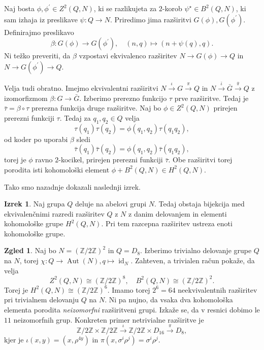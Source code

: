 \documentclass[11pt]{book}
\def\ZZ{\mathbb{Z}}
\DeclareMathOperator\Aut{Aut}
\DeclareMathOperator\id{id}
\theoremstyle{definition}
\theoremstyle{zgled}
\newtheorem*{zgled}{Zgled}
\theoremstyle{odprtproblem}
\theoremstyle{domacanaloga}
\theoremstyle{izrek}
\newtheorem*{izrek}{Izrek}
\begin{document}
Naj bosta $\phi, \phi^\prime \in Z^2(Q,N)$, ki se razlikujeta za $2$-korob $\psi^\star \in B^2(Q,N)$, ki sam izhaja iz preslikave $\psi \colon Q \to N$. Priredimo jima razširitvi $G(\phi), G(\phi^\prime)$. Definirajmo preslikavo
\[
\beta \colon G(\phi) \to G(\phi^\prime), \quad
(n,q) \mapsto (n + \psi(q), q).
\]
Ni težko preveriti, da $\beta$ vzpostavi ekvivalenco razširitev $N \to G(\phi) \to Q$ in $N \to G(\phi^\prime) \to Q$.

Velja tudi obratno. Imejmo ekvivalentni razširitvi $N \xrightarrow{\iota} G \xrightarrow{\pi} Q$ in $N \xrightarrow{\bar \iota} \bar G \xrightarrow{\bar \pi} Q$ z izomorfizmom $\beta \colon G \to \bar G$. Izberimo prerezno funkcijo $\tau$ prve razširitve. Tedaj je $\bar \tau = \beta \circ \tau$ prerezna funkcija druge razširitve. Naj bo $\phi \in Z^2(Q,N)$ prirejen prerezni funkciji $\tau$. Tedaj za $q_1, q_2 \in Q$ velja
\[
\tau(q_1) \tau(q_2) = \phi(q_1, q_2) \tau(q_1 q_2),
\]
od koder po uporabi $\beta$ sledi
\[
\bar \tau(q_1) \bar \tau(q_2) = \phi(q_1, q_2) \bar \tau(q_1 q_2),
\]
torej je $\phi$ ravno $2$-kocikel, prirejen prerezni funkciji $\bar \tau$. Obe razširitvi torej porodita isti kohomološki element $\phi + B^2(Q,N) \in H^2(Q,N)$.

Tako smo nazadnje dokazali naslednji izrek.

\begin{izrek}
Naj grupa $Q$ deluje na abelovi grupi $N$. Tedaj obstaja bijekcija med ekvivalenčnimi razredi razširitev $Q$ z $N$ z danim delovanjem in elementi kohomološke grupe $H^2(Q,N)$. Pri tem razcepna razširitev ustreza enoti kohomološke grupe.
\end{izrek}

\begin{zgled}
Naj bo $N = (\ZZ/2\ZZ)^2$ in $Q = D_8$. Izberimo trivialno delovanje grupe $Q$ na $N$, torej $\chi \colon Q \to \Aut(N), q \mapsto \id_N$. Zahteven, a trivialen račun pokaže, da velja
\[
Z^2(Q,N) \cong (\ZZ/2\ZZ)^8, \quad
B^2(Q,N) \cong (\ZZ/2\ZZ)^2.
\]
Torej je $H^2(Q,N) \cong (\ZZ/2\ZZ)^6$. Imamo torej $2^6 = 64$ neekvivalentnih razširitev pri trivialnem delovanju $Q$ na $N$. Ni pa nujno, da vsaka dva kohomološka elementa porodita {\em neizomorfni} razširitveni grupi. Izkaže se, da v resnici dobimo le $11$ neizomorfnih grup. Konkreten primer netrivialne razširitve je
\[
\ZZ/2\ZZ \times \ZZ/2\ZZ \xrightarrow{\iota} \ZZ/2\ZZ \times D_{16} \xrightarrow{\pi} D_8,
\]
kjer je $\iota(x,y) = (x, \rho^{4y})$ in $\pi(x, \sigma^i \rho^j) = \sigma^i \rho^j$.
\end{zgled}
\end{document}
